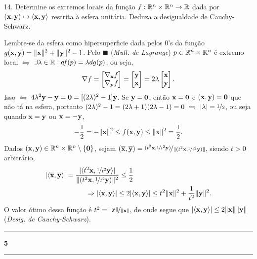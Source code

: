 14. Determine os extremos locais da função \(f: \mathbb{R}^n \times \mathbb{R}^n \to \mathbb{R}\) dada por \((\textbf{x},\textbf{y})\mapsto \langle \textbf{x}, \textbf{y}\rangle\) restrita à esfera unitária. Deduza a desigualdade de Cauchy-Schwarz. 

\textcolor{gris}{
    Lembre-se da esfera como hipersuperficie dada pelos \(0\)'s da função \(g(\textbf{x},\textbf{y}) = \|\textbf{x}\|^2 + \|\textbf{y}\|^2 -1\). Pelo \(\blacksquare\) (\emph{Mult. de Lagrange}) \(p \in \mathbb{R}^n \times \mathbb{R}^n\) é extremo local \(\leftrightharpoons\) \(\exists \lambda \in \mathbb{R} : df(p) = \lambda dg(p)\), ou seja,  
    \[\nabla f = \begin{bmatrix}
        \nabla_{\textbf{x}} f \\ 
        \nabla_{\textbf{y}} f 
    \end{bmatrix} = \begin{bmatrix}
        \textbf{y} \\ 
        \textbf{x}
    \end{bmatrix} = 2\lambda \begin{bmatrix}
        \textbf{x} \\ 
        \textbf{y}
    \end{bmatrix}. \] 
    Isso \(\leftrightharpoons\) \(4\lambda^2\textbf{y} - \textbf{y}  = \textbf{0} = [(2\lambda)^2 - 1]\textbf{y}\). Se \(\textbf{y} = \textbf{0}\), então \(\textbf{x} = \textbf{0}\) e \((\textbf{x},\textbf{y}) = \textbf{0} \) que não tá na esfera, portanto \((2\lambda)^2 - 1 = (2\lambda +1)(2\lambda-1) = 0 \ \leftrightharpoons \ |\lambda| = \nicefrac{1}{2}\), ou seja quando \(\textbf{x}= \textbf{y}\) ou \(\textbf{x} = -\textbf{y}\),  
    \[-\frac{1}{2} =- \|\textbf{x}\|^2 \leq  f(\textbf{x},\textbf{y}) \leq \|\textbf{x}\|^2 = \frac{1}{2} .\] 
    Dados \((\textbf{x},\textbf{y}) \in \mathbb{R}^n \times \mathbb{R}^n \setminus \{\textbf{0}\}\), sejam \((\overline{\textbf{x}}, \overline{\textbf{y}}) =  \nicefrac{(t^2\textbf{x},\nicefrac{1}{t^2}\textbf{y})}{\|(t^2\textbf{x},\nicefrac{1}{t^2}\textbf{y})\|}\), siendo \(t > 0 \) arbitrário, 
    \begin{align*}
        |\langle \overline{\textbf{x}}, \overline{\textbf{y}}\rangle| &=   \frac{|\langle t^2\textbf{x},\nicefrac{1}{t^2} \textbf{y}\rangle |}{\|(t^2\textbf{x}, \nicefrac{1}{t^2}\textbf{y})\|^2} \leq \frac{1}{2} \\
        &\hspace{1cm}\Rightarrow  |\langle \textbf{x}, \textbf{y}\rangle|\leq 2|\langle \textbf{x}, \textbf{y}\rangle| \leq t^2\|\textbf{x}\|^2 + \frac{1}{t^2}\|\textbf{y}\|^2.
    \end{align*}
    O valor ótimo dessa função é \(t^2 = \nicefrac{\|\textbf{y}\|}{\|\textbf{x}\|}\), de onde segue que \(|\langle \textbf{x}, \textbf{y}\rangle| \leq 2\|\textbf{x}\|\|\textbf{y}\|\) (\emph{Desig. de Cauchy-Schwarz}).  
}

\-\vspace{-0.3cm}
  {\hrule \vspace{-0.15cm}
  \centering \textbf{5} \vspace{0.1cm}
  \hrule}

